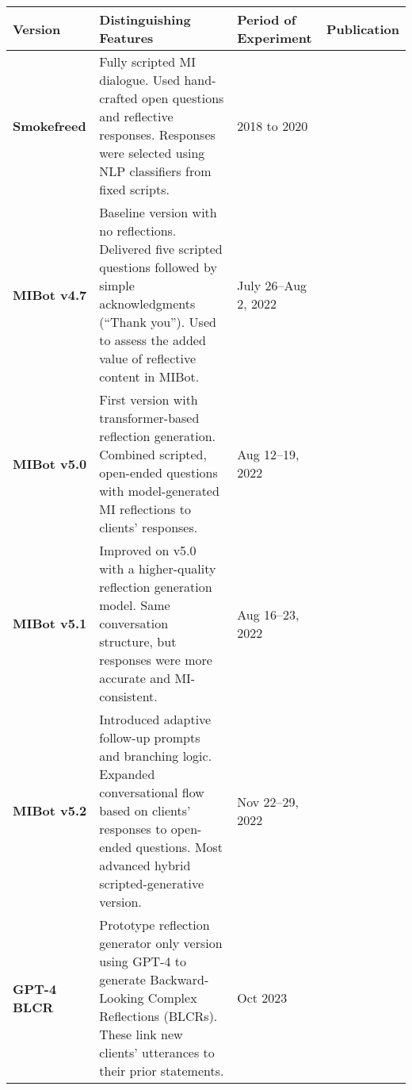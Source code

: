 \begin{table}[!h]
	\small
	\centering
	\begin{tabular}{
		@{}m{}
		m{}
		m{}
		m{}@{}}
		\toprule
		\textbf{Version}     & \textbf{Distinguishing Features}                                                                                                                                                               & \textbf{Period of Experiment}   & \textbf{Publication}     \\
		\midrule
		\arrayrulecolor{gray!50}
		\textbf{Smokefreed}  & Fully scripted MI dialogue. Used hand-crafted open ques\-tions and reflective responses. Responses were selected using NLP classifiers from fixed scripts.                                     & 2018 to 2020                    & \citet{Almusharraf_2019} \\
		\hline
		\textbf{MIBot v4.7}  & Baseline version with no reflections. Delivered five scripted questions followed by simple acknowledgments (``Thank you''). Used to assess the added value of reflective content in MIBot.     & July 26–Aug 2, 2022             & \citet{brown2023mi}      \\
		\hline
		\textbf{MIBot v5.0}  & First version with transformer-based reflection generation. Combined scripted, open-ended questions with model-generated MI reflections to clients' responses.                                 & Aug 12–19, 2022                 & \citet{brown2023mi}      \\
		\hline
		\textbf{MIBot v5.1}  & Improved on v5.0 with a higher-quality reflection generation model. Same conversation structure, but responses were more accurate and MI-consistent.                                           & Aug 16–23, 2022                 & \citet{brown2023mi}      \\
		\hline
		\textbf{MIBot v5.2}  & Introduced adaptive follow-up prompts and branching logic. Expanded conversational flow based on clients' responses to open-ended questions. Most advanced hybrid scripted-generative version. & Nov 22–29, 2022                 & \citet{brown2023mi}      \\
		\hline
		\textbf{GPT-4 BLCR}  & Prototype reflection generator only version using GPT-4 to generate Backward-Looking Complex Reflections (BLCRs). These link new clients' utterances to their prior statements.
		                     & Oct 2023
		                     & \citet{brown2023mi}                                                                                                                                                                                                                                         \\

\end{tabular}
\end{table}
